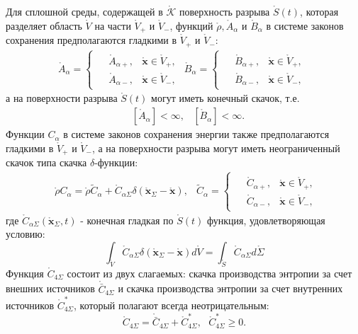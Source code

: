 \begin{axiom}\label{ax17}
	Для сплошной среды, содержащей в $\mathring{\mathcal{K}}$ поверхность разрыва $\mathring{S}(t)$, которая разделяет область $\mathring{V}$ на части $\mathring{V}_+$ и $\mathring{V}_-$, функций $\mathring{\rho}, \mathring{A}_\alpha$ и $\mathring{B}_\alpha$ в системе законов сохранения предполагаются гладкими в $\mathring{V}_+$ и $\mathring{V}_-$:
	\[
	\begin{aligned}
		\mathring{A}_\alpha=\begin{cases}
			\begin{aligned}
				&\mathring{A}_{\alpha+},&\mathring{\mathbf{x}}\in\mathring{V}_+,\\
				&\mathring{A}_{\alpha-},&\mathring{\mathbf{x}}\in\mathring{V}_-,
			\end{aligned}
		\end{cases}
		\mathring{B}_\alpha=\begin{cases}
			\begin{aligned}
				&\mathring{B}_{\alpha+},&\mathring{\mathbf{x}}\in\mathring{V}_+,\\
				&\mathring{B}_{\alpha-},&\mathring{\mathbf{x}}\in\mathring{V}_-,
			\end{aligned}
		\end{cases}
	\end{aligned}
	\]
	а на поверхности разрыва $\mathring{S}(t)$ могут иметь конечный скачок, т.е.
	\[
	\begin{aligned}
		&[\mathring{A}_\alpha] < \infty,&	[\mathring{B}_\alpha] < \infty.
	\end{aligned}
	\]
	Функции $C_\alpha$ в системе законов сохранения энергии также предполагаются гладкими в $\mathring{V}_+$ и $\mathring{V}_-$, а на поверхности разрыва могут иметь неограниченный скачок типа скачка $\delta$-функции:
	\[
	\begin{aligned}
		&\mathring{\rho}C_\alpha=\mathring{\rho}\tilde{C}_\alpha+\mathring{C}_{\alpha\Sigma}\delta(\mathring{\mathbf{x}}_\Sigma-\mathring{\mathbf{x}}),&\tilde{C}_\alpha=\begin{cases}
			\begin{aligned}
				&\mathring{C}_{\alpha+},&\mathring{\mathbf{x}}\in\mathring{V}_+,\\
				&\mathring{C}_{\alpha-},&\mathring{\mathbf{x}}\in\mathring{V}_-,
			\end{aligned}
		\end{cases}
	\end{aligned}
	\]
	где $\mathring{C}_{\alpha\Sigma}(\mathring{\mathbf{x}}_\Sigma,t)$ - конечная гладкая по $\mathring{S}(t)$ функция, удовлетворяющая условию:
	\[
	\int_{\mathring{V}}\mathring{C}_{\alpha\Sigma}\delta(\mathring{\mathbf{x}}_\Sigma-\mathring{\mathbf{x}})d\mathring{V}=\int_{\mathring{S}}\mathring{C}_{\alpha\Sigma}d\mathring{\Sigma}
	\]
	Функция $\mathring{C}_{4\Sigma}$ состоит из двух слагаемых: скачка производства энтропии за счет внешних источников $\mathring{\bar{C}}_{4\Sigma}$ и скачка производства энтропии за
	счет внутренних источников $\mathring{C}_{4\Sigma}^*$, который полагают всегда неотрицательным:
	\[
	\mathring{C}_{4\Sigma}=\mathring{\bar{C}}_{4\Sigma}+\mathring{C}_{4\Sigma}^*,~~~\mathring{C}_{4\Sigma}^*\geq 0.
	\]
\end{axiom}
